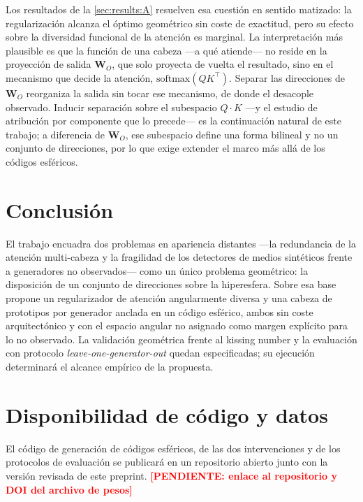\documentclass[11pt,a4paper]{article}
\theoremstyle{plain}
\newcommand{\todo}[1]{\textcolor{red}{\textbf{[PENDIENTE: #1]}}}
\begin{document}
Los resultados de la \cref{sec:results:A} resuelven esa cuestión en
sentido matizado: la regularización alcanza el óptimo geométrico sin
coste de exactitud, pero su efecto sobre la diversidad funcional de la
atención es marginal. La interpretación más plausible es que la función
de una cabeza ---a qué atiende--- no reside en la proyección de salida
$\bm{W}_O$, que solo proyecta de vuelta el resultado, sino en el
mecanismo que decide la atención, $\mathrm{softmax}(QK^\top)$. Separar
las direcciones de $\bm{W}_O$ reorganiza la salida sin tocar ese
mecanismo, de donde el desacople observado. Inducir separación sobre el
subespacio $Q\cdot K$ ---y el estudio de atribución por componente que
lo precede--- es la continuación natural de este trabajo; a diferencia
de $\bm{W}_O$, ese subespacio define una forma bilineal y no un conjunto
de direcciones, por lo que exige extender el marco más allá de los
códigos esféricos.

\section{Conclusión}
\label{sec:conclusion}

El trabajo encuadra dos problemas en apariencia distantes ---la
redundancia de la atención multi-cabeza y la fragilidad de los
detectores de medios sintéticos frente a generadores no observados---
como un único problema geométrico: la disposición de un conjunto de
direcciones sobre la hiperesfera. Sobre esa base propone un regularizador
de atención angularmente diversa y una cabeza de prototipos por
generador anclada en un código esférico, ambos sin coste arquitectónico
y con el espacio angular no asignado como margen explícito para lo no
observado. La validación geométrica frente al kissing number y la
evaluación con protocolo \emph{leave-one-generator-out} quedan
especificadas; su ejecución determinará el alcance empírico de la
propuesta.

\section*{Disponibilidad de código y datos}
El código de generación de códigos esféricos, de las dos intervenciones
y de los protocolos de evaluación se publicará en un repositorio abierto
junto con la versión revisada de este preprint. \todo{enlace al
repositorio y DOI del archivo de pesos}
\end{document}
